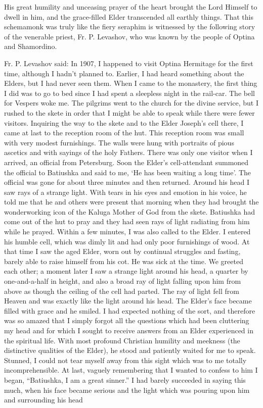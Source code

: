 His great humility and unceasing prayer of the heart brought the Lord Himself to dwell in him, and the grace-filled Elder transcended all earthly things. That this schemamonk was truly like the fiery seraphim is witnessed by the following story of the venerable priest, Fr. P. Levashov, who was known by the people of Optina and Shamordino.

\begin{longquote}{Fr. P. Levashov said:}
In 1907, I happened to visit Optina Hermitage for the first time, although I hadn't planned to. Earlier, I had heard something about the Elders, but I had never seen them. When I came to the monastery, the first thing I did was to go to bed since I had spent a sleepless night in the rail-car. The bell for Vespers woke me. The pilgrims went to the church for the divine service, but I rushed to the skete in order that I might be able to speak while there were fewer visitors. Inquiring the way to the skete and to the Elder Joseph's cell there, I came at last to the reception room of the hut. This reception room was small with very modest furnishings. The walls were hung with portraits of pious ascetics and with sayings of the holy Fathers. There was only one visitor when I arrived, an official from Petersburg. Soon the Elder's cell-attendant summoned the official to Batiushka and said to me, `He has been waiting a long time'. The official was gone for about three minutes and then returned. Around his head I saw rays of a strange light. With tears in his eyes and emotion in his voice, he told me that he and others were present that morning when they had brought the wonderworking icon of the Kaluga Mother of God from the skete. Batiushka had come out of the hut to pray and they had seen rays of light radiating from him while he prayed. Within a few minutes, I was also called to the Elder. I entered his humble cell, which was dimly lit and had only poor furnishings of wood. At that time I saw the aged Elder, worn out by continual struggles and fasting, barely able to raise himself from his cot. He was sick at the time. We greeted each other; a moment later I saw a strange light around his head, a quarter by one-and-a-half in height, and also a broad ray of light falling upon him from above as though the ceiling of the cell had parted. The ray of light fell from Heaven and was exactly like the light around his head. The Elder's face became filled with grace and he smiled. I had expected nothing of the sort, and therefore was so amazed that I simply forgot all the questions which had been cluttering my head and for which I sought to receive answers from an Elder experienced in the spiritual life. With most profound Christian humility and meekness (the distinctive qualities of the Elder), he stood and patiently waited for me to speak. Stunned, I could not tear myself away from this sight which was to me totally incomprehensible. At last, vaguely remembering that I wanted to confess to him I began, “Batiushka, I am a great sinner.” I had barely succeeded in saying this much, when his face became serious and the light which was pouring upon him and surrounding his head 
\end{longquote}

